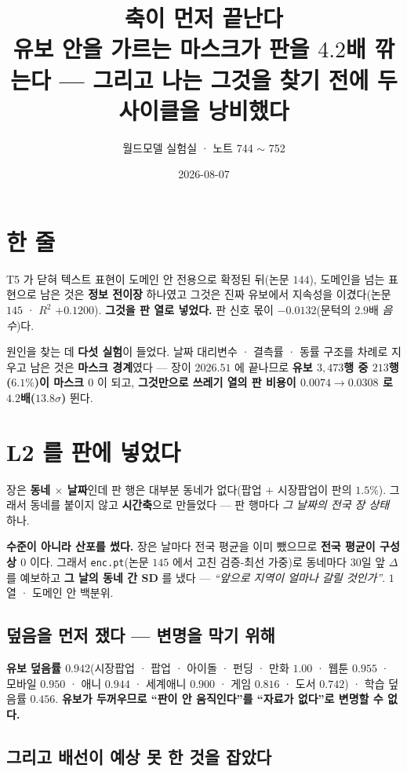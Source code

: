 \documentclass[10pt,a4paper]{article}
\title{\bfseries 축이 먼저 끝난다\\[2pt]
\large 유보 안을 가르는 마스크가 판을 $4.2$배 깎는다 --- 그리고 나는 그것을 찾기 전에
두 사이클을 낭비했다}
\author{월드모델 실험실 · 노트 744 $\sim$ 752}
\date{2026-08-07}
\begin{document}
\maketitle

\section{한 줄}

T5 가 닫혀 텍스트 표현이 도메인 안 전용으로 확정된 뒤(논문 $144$), 도메인을 넘는
표현으로 남은 것은 \textbf{정보 전이장} 하나였고 그것은 진짜 유보에서
지속성을 이겼다(논문 $145$ · $R^2$ $+0.1200$). \textbf{그것을 판 열로 넣었다.}
판 신호 몫이 $\mathbf{-0.0132}$(문턱의 $2.9$배 \emph{음수})다.

원인을 찾는 데 \textbf{다섯 실험}이 들었다. 날짜 대리변수 · 결측률 · 동률 구조를
차례로 지우고 남은 것은 \textbf{마스크 경계}였다 --- 장이 $2026.51$ 에 끝나므로
\textbf{유보 $3{,}473$행 중 $213$행($6.1\%$)이 마스크 $0$} 이 되고, \textbf{그것만으로
쓰레기 열의 판 비용이 $0.0074 \to 0.0308$ 로 $4.2$배($13.8\sigma$)} 뛴다.

\section{L2 를 판에 넣었다}

장은 \textbf{동네 $\times$ 날짜}인데 판 행은 대부분 동네가 없다(팝업 $+$ 시장팝업이
판의 $1.5\%$). 그래서 동네를 붙이지 않고 \textbf{시간축}으로 만들었다 --- 판 행마다
\emph{그 날짜의 전국 장 상태} 하나.

\textbf{수준이 아니라 산포를 썼다.} 장은 날마다 전국 평균을 이미 뺐으므로
\textbf{전국 평균이 구성상 $0$} 이다. 그래서 \texttt{enc.pt}(논문 $145$ 에서 고친
검증-최선 가중)로 동네마다 $30$일 앞 $\Delta$ 를 예보하고 \textbf{그 날의 동네 간
SD} 를 냈다 --- \emph{``앞으로 지역이 얼마나 갈릴 것인가''}. $1$열 · 도메인 안 백분위.

\subsection*{덮음을 먼저 쟀다 --- 변명을 막기 위해}

\textbf{유보 덮음률 $0.942$}(시장팝업 · 팝업 · 아이돌 · 펀딩 · 만화 $1.00$ · 웹툰
$0.955$ · 모바일 $0.950$ · 애니 $0.944$ · 세계애니 $0.900$ · 게임 $0.816$ · 도서
$0.742$) · 학습 덮음률 $0.456$. \textbf{유보가 두꺼우므로 ``판이 안 움직인다''를
``자료가 없다''로 변명할 수 없다.}

\subsection*{그리고 배선이 예상 못 한 것을 잡았다}
\end{document}
